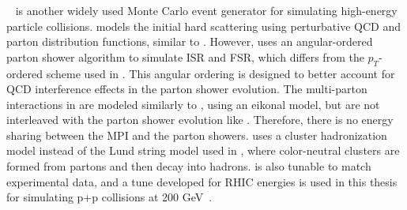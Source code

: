\subsubsection{\herwig}
\herwig~\cite{herwig7,herwig7_tune} is another widely used Monte Carlo event generator for simulating high-energy particle collisions. 
\herwig models the initial hard scattering using perturbative QCD and parton distribution functions, similar to \pythia.
However, \herwig uses an angular-ordered parton shower algorithm to simulate ISR and FSR, which differs from the $p_{T}$-ordered scheme used in \pythia. 
This angular ordering is designed to better account for QCD interference effects in the parton shower evolution. 
The multi-parton interactions in \herwig are modeled similarly to \pythia, using an eikonal model, but are not interleaved with the parton shower evolution like \pythia.
Therefore, there is no energy sharing between the MPI and the parton showers.
\herwig uses a cluster hadronization model instead of the Lund string model used in \pythia, where color-neutral clusters are formed from partons and then decay into hadrons.
\herwig is also tunable to match experimental data, and a tune developed for RHIC energies is used in this thesis for simulating p+p collisions at 200 GeV~\cite{herwig7_tune}.